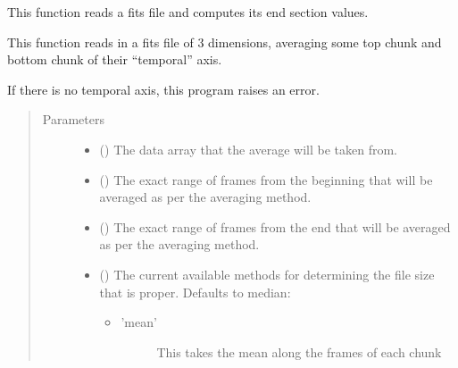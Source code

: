 \documentclass[letterpaper,10pt,english]{sphinxmanual}
\begin{document}
\begin{fulllineitems}
\label{\detokenize{docstrings/ifa_smeargle.reformat.collapse:ifa_smeargle.reformat.collapse.collapse_by_average_endpoints}}
This function reads a fits file and computes its end section
values.

This function reads in a fits file of 3 dimensions, averaging
some top chunk and bottom chunk of their “temporal” axis.

If there is no temporal axis, this program raises an error.
\begin{quote}\begin{description}
\item[{Parameters}] \leavevmode\begin{itemize}
\item {} 
 () \textendash{} The data array that the average will be taken from.

\item {} 
 () \textendash{} The exact range of frames from the beginning that will be
averaged as per the averaging method.

\item {} 
 () \textendash{} The exact range of frames from the end that will be averaged
as per the averaging method.

\item {} 
 (\sphinxstyleliteralemphasis{\sphinxupquote{ (}}\sphinxstyleliteralemphasis{\sphinxupquote{)}}) \textendash{} 
The current available methods for determining the file size
that is proper. Defaults to median:
\begin{itemize}
\item {} \begin{description}
\item[{’mean’}] \leavevmode
This takes the mean along the frames of each
chunk


\end{description}
\end{itemize}
\end{itemize}
\end{description}
\end{quote}
\end{fulllineitems}
\end{document}
